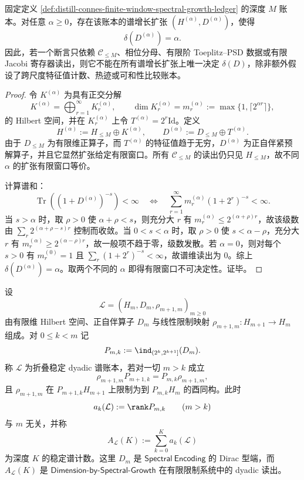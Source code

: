\begin{proposition}[有限窗口不能决定谱维读出]\label{prop:distill-connes-finite-window-spectral-mirage}
固定定义 \ref{def:distill-connes-finite-window-spectral-growth-ledger} 的深度 \(M\) 账本。对任意 \(\alpha\ge0\)，存在该账本的谱增长扩张 \((H^{(\alpha)},D^{(\alpha)})\)，使得
\[
\delta(D^{(\alpha)})=\alpha.
\]
因此，若一个断言只依赖 \(\mathcal C_{\le M}\)、相位分母、有限阶 Toeplitz--PSD 数据或有限 Jacobi 寄存器读出，则它不能在所有谱增长扩张上唯一决定 \(\delta(D)\)，除非额外假设了跨尺度特征值计数、热迹或可和性比较账本。
\end{proposition}
\begin{proof}
令 \(K^{(\alpha)}\) 为具有正交分解
\[
K^{(\alpha)}=\bigoplus_{r=1}^{\infty}K_r^{(\alpha)},\qquad
\dim K_r^{(\alpha)}=m_r^{(\alpha)}:=\max\{1,\lceil 2^{\alpha r}\rceil\},
\]
的 Hilbert 空间，并在 \(K_r^{(\alpha)}\) 上令 \(T^{(\alpha)}=2^r\mathrm{Id}\)。定义
\[
H^{(\alpha)}:=H_{\le M}\oplus K^{(\alpha)},\qquad
D^{(\alpha)}:=D_{\le M}\oplus T^{(\alpha)}.
\]
由于 \(D_{\le M}\) 为有限维正算子，而 \(T^{(\alpha)}\) 的特征值趋于无穷，\(D^{(\alpha)}\) 为正自伴紧预解算子，并且它显然扩张给定有限窗口。所有 \(\mathcal C_{\le M}\) 的读出仍只见 \(H_{\le M}\)，故不同 \(\alpha\) 的扩张有限窗口等价。

计算谱和：
\[
\operatorname{Tr}((1+D^{(\alpha)})^{-s})<\infty
\quad\Longleftrightarrow\quad
\sum_{r=1}^{\infty}m_r^{(\alpha)}(1+2^r)^{-s}<\infty.
\]
当 \(s>\alpha\) 时，取 \(\rho>0\) 使 \(\alpha+\rho<s\)，则充分大 \(r\) 有 \(m_r^{(\alpha)}\le 2^{(\alpha+\rho)r}\)，故该级数由 \(\sum_r2^{(\alpha+\rho-s)r}\) 控制而收敛。当 \(0<s<\alpha\) 时，取 \(\rho>0\) 使 \(s<\alpha-\rho\)，充分大 \(r\) 有 \(m_r^{(\alpha)}\ge2^{(\alpha-\rho)r}\)，故一般项不趋于零，级数发散。若 \(\alpha=0\)，则对每个 \(s>0\) 有 \(m_r^{(0)}=1\) 且 \(\sum_r(1+2^r)^{-s}<\infty\)，故谱维读出为 \(0\)。综上 \(\delta(D^{(\alpha)})=\alpha\)。取两个不同的 \(\alpha\) 即得有限窗口不可决定性。证毕。
\end{proof}
\begin{definition}\label{distill:connes_spectral_triples_and_chamseddine_connes_spectral_action-spectral_dimension_and_volume_family-fold-stable-dyadic-spectral-ledger}
设
\[
\mathcal L=(H_m,D_m,\rho_{m+1,m})_{m\ge 0}
\]
由有限维 Hilbert 空间、正自伴算子 \(D_m\) 与线性限制映射 \(\rho_{m+1,m}:H_{m+1}\to H_m\) 组成。对 \(0\le k<m\) 记
\[
P_{m,k}:=\ind_{(2^k,2^{k+1}]}(D_m).
\]
称 \(\mathcal L\) 为折叠稳定 dyadic 谱账本，若对一切 \(m>k\) 成立
\[
\rho_{m+1,m}P_{m+1,k}=P_{m,k}\rho_{m+1,m},
\]
且 \(\rho_{m+1,m}\) 在 \(P_{m+1,k}H_{m+1}\) 上限制为到 \(P_{m,k}H_m\) 的酉同构。此时
\[
a_k(\mathcal L):=\rank P_{m,k}\qquad(m>k)
\]
与 \(m\) 无关，并称
\[
A_{\mathcal L}(K):=\sum_{k=0}^{K}a_k(\mathcal L)
\]
为深度 \(K\) 的稳定谱计数。这里 \(D_m\) 是 \(\mathsf{Spectral\ Encoding}\) 的 Dirac 型端，而 \(A_{\mathcal L}(K)\) 是 \(\mathsf{Dimension\mbox{-}by\mbox{-}Spectral\mbox{-}Growth}\) 在有限限制系统中的 dyadic 读出。
\end{definition}

